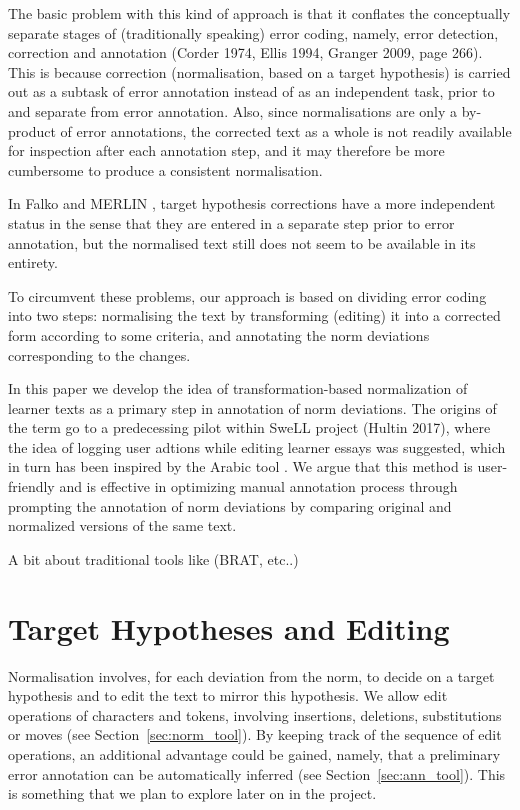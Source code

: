 \documentclass[10pt, a4paper]{article}
\begin{document}
The basic problem with this kind of approach is that it conflates the conceptually separate stages of (traditionally speaking) error coding, namely, error detection, correction and annotation (Corder 1974, Ellis 1994, Granger 2009, page 266). This is because correction (normalisation, based on a target hypothesis) is carried out as a subtask of error annotation instead of as an independent task, prior to and separate from error annotation. Also, since normalisations are only a by-product of error annotations, the corrected text as a whole is not readily available for inspection after each annotation step, and it may therefore be more cumbersome to produce a consistent normalisation.

In Falko \cite{ludeling05multi-levelerror} and MERLIN  \cite{MERLIN2014},
target hypothesis corrections have a more independent status in the sense that they are entered in a separate step prior to error annotation, but the normalised text still does not seem to be available in its entirety.

To circumvent these problems, our approach is based on dividing error coding into two steps: normalising the text by transforming (editing) it into a corrected form according to some criteria, and annotating the norm deviations corresponding to the changes.

In this paper we develop the idea of transformation-based normalization of learner texts as a primary step in annotation of norm deviations. The origins of the term go to a predecessing pilot within SweLL project (Hultin 2017), where the idea of logging user adtions while editing learner essays was suggested, which in turn has been inspired by the Arabic tool . We argue that this method is user-friendly and is effective in optimizing manual annotation process through prompting the annotation of norm deviations by comparing original and normalized versions of the same text. 

A bit about traditional tools like   (BRAT, etc..)   

\section{Target Hypotheses and Editing}

Normalisation involves, for each deviation from the norm, to decide on a target hypothesis and to edit the text to mirror this hypothesis. We allow edit operations of characters and tokens, involving insertions, deletions, substitutions %
or moves (see Section~\ref{sec:norm_tool}). By keeping track of the sequence of edit operations, an additional advantage could be gained, namely, that a preliminary error annotation can be automatically inferred (see Section~\ref{sec:ann_tool}). This is something that we plan to explore later on in the project.
\end{document}
